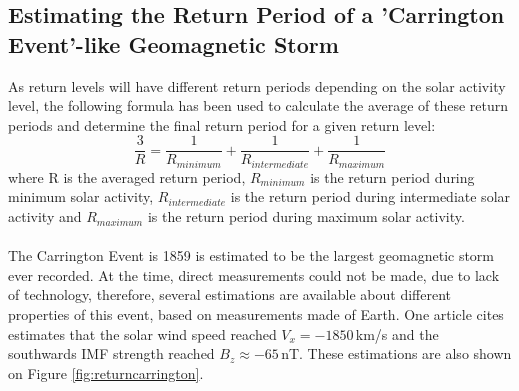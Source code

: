 \documentclass[12pt]{article}
\begin{document}
    \subsection{Estimating the Return Period of a 'Carrington Event'-like Geomagnetic Storm}\label{sec:carrington}
        As return levels will have different return periods depending on the solar activity level, the following formula has been used to calculate the average of these return periods and determine the final return period for a given return level:
        \begin{equation}
            \frac{3}{R}=\frac{1}{R_{minimum}}+\frac{1}{R_{intermediate}}+\frac{1}{R_{maximum}}
        \end{equation}
        where R is the averaged return period, $R_{minimum}$ is the return period during minimum solar activity, $R_{intermediate}$ is the return period during intermediate solar activity and $R_{maximum}$ is the return period during maximum solar activity.\\ \\
        The Carrington Event is 1859 is estimated to be the largest geomagnetic storm ever recorded. At the time, direct measurements could not be made, due to lack of technology, therefore, several estimations are available about different properties of this event, based on measurements made of Earth. One article cites\cite{2013cliver} estimates that the solar wind speed reached $V_x=-1850\,$km/s and the southwards IMF strength reached $B_z\approx -65\,$nT. These estimations are also shown on Figure \ref{fig:returncarrington}.\\
\end{document}

